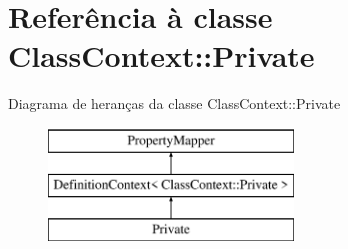 \hypertarget{class_class_context_1_1_private}{\section{Referência à classe Class\-Context\-:\-:Private}
\label{class_class_context_1_1_private}
}
Diagrama de heranças da classe Class\-Context\-:\-:Private\begin{figure}[H]
\begin{center}
\leavevmode
\includegraphics[height=3.000000cm]{class_class_context_1_1_private}
\end{center}
\end{figure}
